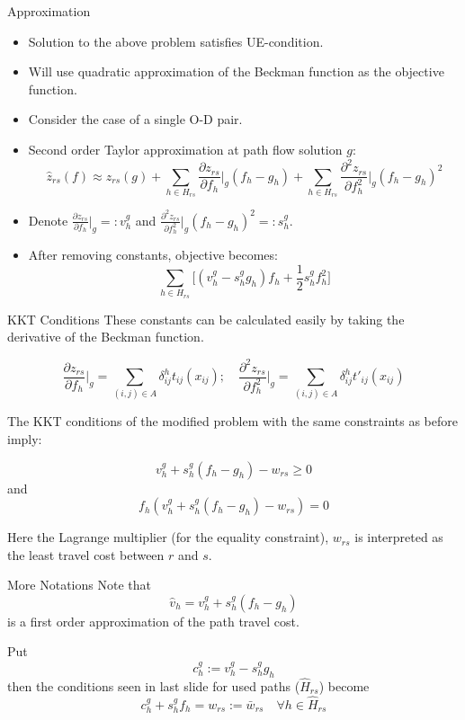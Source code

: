 \documentclass{beamer}
\begin{document}
\begin{frame}{Approximation}
\begin{itemize}
    \item Solution to the above problem satisfies
    UE-condition.
    
    \item Will use quadratic approximation of the
    Beckman function as the objective function.

    \item Consider the case of a single O-D pair.

    \item Second order Taylor approximation at path flow
    solution $g$:
    \[
        \hat{z}_{rs}(f) \approx z_{rs}(g) +
        \sum_{h\in H_{rs}}\frac{\partial z_{rs}}{\partial f_h}\bigg|_{g}
        (f_h-g_h)+
        \sum_{h\in H_{rs}} \frac{\partial ^2 z_{rs}}{\partial f_h^2}\bigg|_g(f_h-g_h)^2
    \]

    \item Denote $\frac{\partial z_{rs}}{\partial f_h}\big|_{g}=: v_h^g$ and
    $\frac{\partial ^2 z_{rs}}{\partial f_h^2}\big|_g(f_h-g_h)^2 =: s_h^g$.

    \item After removing constants, objective becomes:
    \[
        \sum_{h\in H_{rs}}\big[(v_h^g - s_h^g g_h)f_h + \frac{1}{2}
        s_h^g f_h^2\big]
    \]
\end{itemize}
\end{frame}

\begin{frame}{KKT Conditions}
These constants can be calculated easily by
taking the derivative of the Beckman function.

\[
\frac{\partial z_{rs}}{\partial f_h}\bigg|_{g}
= \sum_{(i,j)\in A}\delta_{ij}^h t_{ij}(x_{ij});\quad
\frac{\partial ^2 z_{rs}}{\partial f_h^2}\bigg|_g
= \sum_{(i,j)\in A} \delta_{ij}^h t'_{ij}(x_{ij})
\]

The KKT conditions of the modified problem with the
same constraints as before imply:

\[v_h^g + s_h^g(f_h-g_h) - w_{rs} \geq 0\]
and 
\[f_h(v_h^g + s_h^g(f_h-g_h) - w_{rs}) = 0\]

Here the Lagrange multiplier (for the equality constraint),
$w_{rs}$ is interpreted as the least travel cost between
$r$ and $s$.


\end{frame}

\begin{frame}{More Notations}
Note that
\[
\hat{v}_h = v_h^g + s_h^g(f_h-g_h)
\]
is a first order approximation of the path travel cost.

Put
\[
c_h^g := v_h^g - s_h^g g_h
\]
then the conditions seen in last slide for used paths
($\hat{H}_{rs}$) become
\[
    c_h^g + s_h^g f_h = w_{rs} := \bar{w}_{rs} \quad \forall h\in\hat{H}_{rs}
\]
\end{frame}
\end{document}
